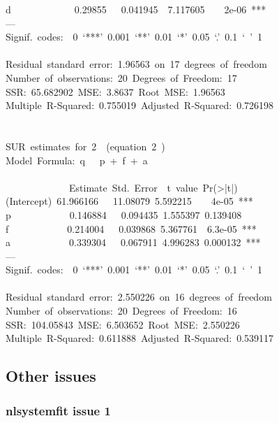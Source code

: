 {d~~~~~~~~~~~~~0.29855~~~0.041945~~7.117605~~~~2e-06~***~\\
---~\\
Signif.~codes:~~0~`***'~0.001~`**'~0.01~`*'~0.05~`.'~0.1~`~'~1~\\
~\\
Residual~standard~error:~1.96563~on~17~degrees~of~freedom~\\
Number~of~observations:~20~Degrees~of~Freedom:~17~\\
SSR:~65.682902~MSE:~3.8637~Root~MSE:~1.96563~\\
Multiple~R-Squared:~0.755019~Adjusted~R-Squared:~0.726198~\\
~\\
~\\
SUR~estimates~for~2~~(equation~2~)~\\
Model~Formula:~q~~~p~+~f~+~a\\
\\
\mbox{}~~~~~~~~~~~~~Estimate~Std.~Error~~t~value~Pr(>|t|)~\\
(Intercept)~61.966166~~~11.08079~5.592215~~~~4e-05~***~\\
p~~~~~~~~~~~~0.146884~~~0.094435~1.555397~0.139408~\\
f~~~~~~~~~~~~0.214004~~~0.039868~5.367761~~6.3e-05~***~\\
a~~~~~~~~~~~~0.339304~~~0.067911~4.996283~0.000132~***~\\
---~\\
Signif.~codes:~~0~`***'~0.001~`**'~0.01~`*'~0.05~`.'~0.1~`~'~1~\\
~\\
Residual~standard~error:~2.550226~on~16~degrees~of~freedom~\\
Number~of~observations:~20~Degrees~of~Freedom:~16~\\
SSR:~104.05843~MSE:~6.503652~Root~MSE:~2.550226~\\
Multiple~R-Squared:~0.611888~Adjusted~R-Squared:~0.539117~\\
}



\subsection{Other issues}


\subsubsection{nlsystemfit issue 1}


